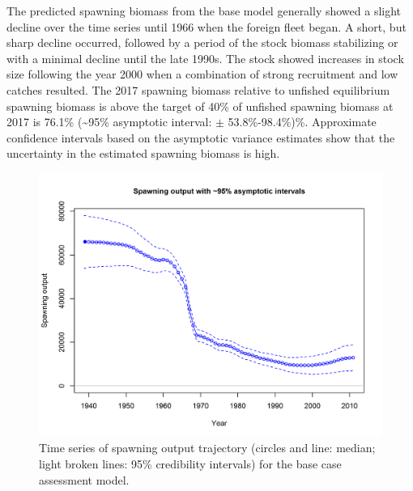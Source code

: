 \documentclass[12pt,]{article}
\begin{document}
The predicted spawning biomass from the base model generally showed a
slight decline over the time series until 1966 when the foreign fleet
began. A short, but sharp decline occurred, followed by a period of the
stock biomass stabilizing or with a minimal decline until the late
1990s. The stock showed increases in stock size following the year 2000
when a combination of strong recruitment and low catches resulted. The
2017 spawning biomass relative to unfished equilibrium spawning biomass
is above the target of 40\% of unfished spawning biomass at 2017 is
76.1\% (\textasciitilde{}95\% asymptotic interval: \(\pm\)
53.8\%-98.4\%)\%. Approximate confidence intervals based on the
asymptotic variance estimates show that the uncertainty in the estimated
spawning biomass is high.

\begin{figure}
\centering
\includegraphics{r4ss/plots_mod1/ts7_Spawning_output_with_95_asymptotic_intervals_intervals.png}
\caption{Time series of spawning output trajectory (circles and line:
median; light broken lines: 95\% credibility intervals) for the base
case assessment model. \label{fig:Spawnbio_all}}
\end{figure}
\end{document}
